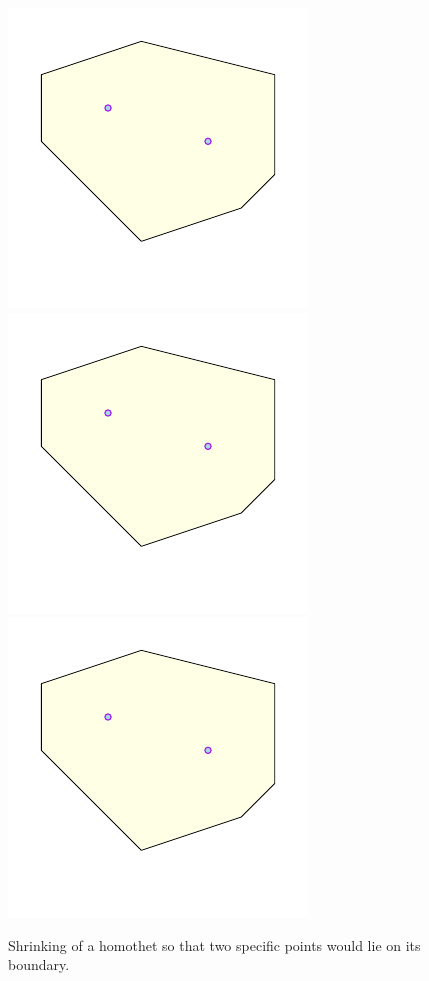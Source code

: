 \begin{figure}[h]
    \includegraphics[page=1]{../figs/shrink_2}%
    \hfill%
    \includegraphics[page=2]{../figs/shrink_2}%
    \hfill%
    \includegraphics[page=3]{../figs/shrink_2}
    \caption{Shrinking of a homothet so that two specific points would
       lie on its boundary.}
\end{figure}




